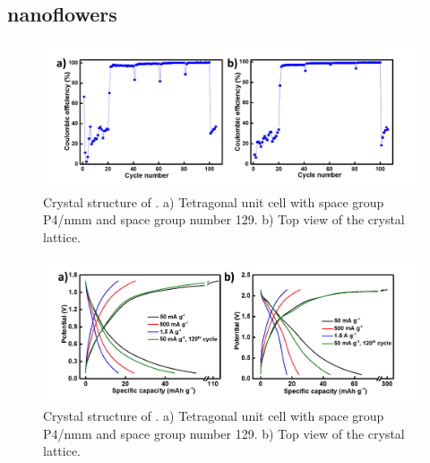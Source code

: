 \subsection*{ nanoflowers}
 \begin{figure}[tbh!]
  \centering
  \includegraphics[width=\textwidth]{Figures/chap6fig/MoX2YNCEs}
    \caption{Crystal structure of . a) Tetragonal unit cell with space group P4/nmm and space group number 129. b) Top view of the crystal lattice.}
  \label{Figures/chap6fig:MoX2YNCEs}
\end{figure}
 \begin{figure}[tbh!]
  \centering
  \includegraphics[width=\textwidth]{Figures/chap6fig/MoX2YNCDCs}
    \caption{Crystal structure of . a) Tetragonal unit cell with space group P4/nmm and space group number 129. b) Top view of the crystal lattice.}
  \label{Figures/chap6fig:MoX2YNCDCs}
\end{figure}
